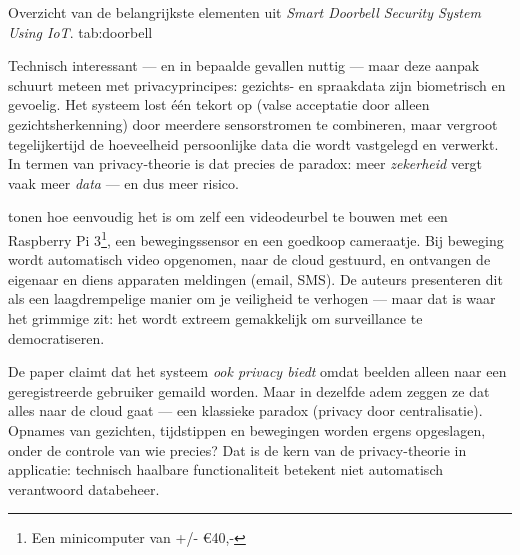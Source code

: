 \documentclass[nonacm,sigconf]{acmart}
\begin{document}
    \SimpleTable
    {Overzicht van de belangrijkste elementen uit \textit{Smart Doorbell Security System Using IoT}.}
    {tab:doorbell}
    {
    }

    \noindent
    Technisch interessant — en in bepaalde gevallen nuttig — maar deze aanpak schuurt meteen met privacyprincipes: gezichts- en spraakdata zijn biometrisch en gevoelig. Het systeem lost één tekort op (valse acceptatie door alleen gezichtsherkenning) door meerdere sensorstromen te combineren, maar vergroot tegelijkertijd de hoeveelheid persoonlijke data die wordt vastgelegd en verwerkt. In termen van privacy-theorie is dat precies de paradox: meer \emph{zekerheid} vergt vaak meer \emph{data} — en dus meer risico.

    \bigskip


    \parencite{lalitha2019smart} tonen hoe eenvoudig het is om zelf een videodeurbel te bouwen met een Raspberry Pi 3\footnote{Een minicomputer van +/- €40,-}, een bewegingssensor en een goedkoop cameraatje. Bij beweging wordt automatisch video opgenomen, naar de cloud gestuurd, en ontvangen de eigenaar en diens apparaten meldingen (email, SMS). De auteurs presenteren dit als een laagdrempelige manier om je veiligheid te verhogen — maar dat is waar het grimmige zit: het wordt extreem gemakkelijk om surveillance te democratiseren.

    \noindent
    De paper claimt dat het systeem \emph{ook privacy biedt} omdat beelden alleen naar een geregistreerde gebruiker gemaild worden. Maar in dezelfde adem zeggen ze dat alles naar de cloud gaat — een klassieke paradox (privacy door centralisatie). Opnames van gezichten, tijdstippen en bewegingen worden ergens opgeslagen, onder de controle van wie precies? Dat is de kern van de privacy-theorie in applicatie: technisch haalbare functionaliteit betekent niet automatisch verantwoord databeheer.
\end{document}
